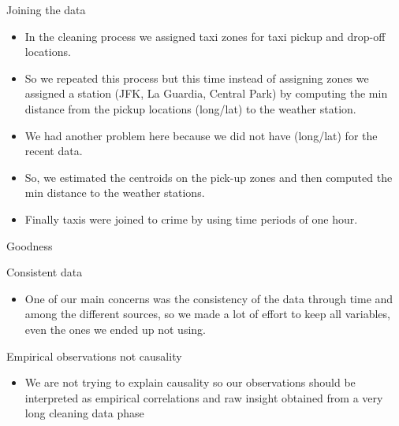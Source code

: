 \documentclass[10pt,ignorenonframetext,]{beamer}
\providecommand{\tightlist}{%
  \setlength{\itemsep}{0pt}\setlength{\parskip}{0pt}}
\begin{document}
\begin{frame}

\begin{block}{Joining the data}

\begin{itemize}[<+->]
\tightlist
\item
  In the cleaning process we assigned taxi zones for taxi pickup and
  drop-off locations.
\end{itemize}

\begin{itemize}[<+->]
\tightlist
\item
  So we repeated this process but this time instead of assigning zones
  we assigned a station (JFK, La Guardia, Central Park) by computing the
  min distance from the pickup locations (long/lat) to the weather
  station.
\item
  We had another problem here because we did not have (long/lat) for the
  recent data.
\item
  So, we estimated the centroids on the pick-up zones and then computed
  the min distance to the weather stations.
\end{itemize}

\begin{itemize}[<+->]
\tightlist
\item
  Finally taxis were joined to crime by using time periods of one hour.
\end{itemize}

\end{block}

\end{frame}

\begin{frame}{%
\protect\hypertarget{goodness}{%
Goodness}}

\begin{block}{Consistent data}

\begin{itemize}
\tightlist
\item
  One of our main concerns was the consistency of the data through time
  and among the different sources, so we made a lot of effort to keep
  all variables, even the ones we ended up not using.
\end{itemize}

\end{block}

\begin{block}{Empirical observations not causality}

\begin{itemize}
\tightlist
\item
  We are not trying to explain causality so our observations should be
  interpreted as empirical correlations and raw insight obtained from a
  very long cleaning data phase
\end{itemize}

\end{block}

\end{frame}
\end{document}
